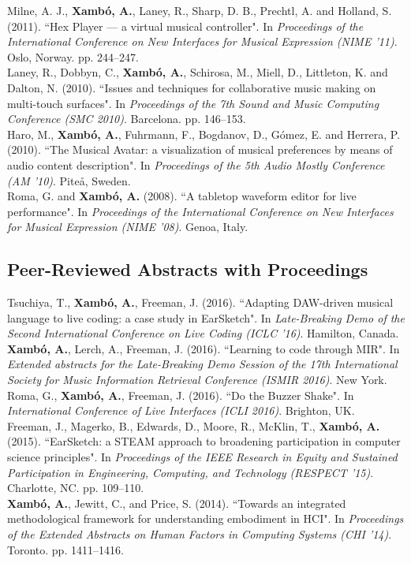 \documentclass[10pt, a4paper]{article}
\newcommand{\years}[1]{\marginnote{\scriptsize #1}}
\begin{document}
\years{2011a}Milne, A. J., \textbf{Xambó, A.}, Laney, R., Sharp, D. B., Prechtl, A. and Holland, S. (2011). “Hex Player — a virtual musical controller". In \emph{Proceedings of the International Conference on New Interfaces for Musical Expression (NIME '11)}. Oslo, Norway. pp. 244--247.\\
\years{2010b}Laney, R., Dobbyn, C., \textbf{Xambó, A.}, Schirosa, M., Miell, D., Littleton, K. and Dalton, N. (2010). “Issues and techniques for collaborative music making on multi-touch surfaces". In \emph{Proceedings of the 7th Sound and Music Computing Conference (SMC 2010)}. Barcelona. pp. 146–153.\\
\years{2010a}Haro, M., \textbf{Xambó, A.}, Fuhrmann, F., Bogdanov, D., Gómez, E. and Herrera, P. (2010). “The Musical Avatar: a visualization of musical preferences by means of audio content description". In \emph{Proceedings of the 5th Audio Mostly Conference (AM '10)}. Piteå, Sweden.\\
\years{2008}Roma, G. and \textbf{Xambó, A.} (2008). “A tabletop waveform editor for live performance". In \emph{Proceedings of the International Conference on New Interfaces for Musical Expression (NIME '08)}. Genoa, Italy.\\

\subsection*{Peer-Reviewed Abstracts with Proceedings}
\noindent
\years{2016c}Tsuchiya, T., \textbf{Xambó, A.}, Freeman, J. (2016). “Adapting DAW-driven musical language to live coding: a case study in EarSketch". In \emph{Late-Breaking Demo of the Second International Conference on Live Coding (ICLC '16)}. Hamilton, Canada.\\ 
\years{2016b}\textbf{Xambó, A.}, Lerch, A., Freeman, J. (2016). “Learning to code through MIR". In \emph{Extended abstracts for the Late-Breaking Demo Session of the 17th International Society for Music Information Retrieval Conference (ISMIR 2016)}. New York.\\
\years{2016a}Roma, G., \textbf{Xambó, A.}, Freeman, J. (2016). “Do the Buzzer Shake". In \emph{International Conference of Live Interfaces (ICLI 2016)}. Brighton, UK.\\
\years{2015}Freeman, J., Magerko, B., Edwards, D., Moore, R., McKlin, T., \textbf{Xambó, A.} (2015). “EarSketch: a STEAM approach to broadening participation in computer science principles". In \emph{Proceedings of the IEEE Research in Equity and Sustained Participation in Engineering, Computing, and Technology (RESPECT '15)}. Charlotte, NC. pp. 109--110.\\
\years{2014}\textbf{Xambó, A.}, Jewitt, C., and Price, S. (2014). “Towards an integrated methodological framework for understanding embodiment in HCI". In \emph{Proceedings of the Extended Abstracts on Human Factors in Computing Systems (CHI '14)}. Toronto. pp. 1411--1416.
\end{document}
